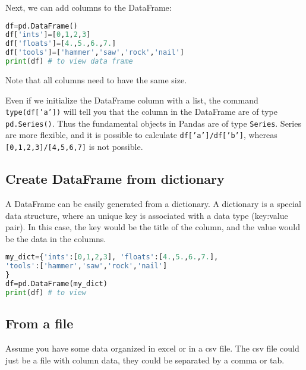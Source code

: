 \documentclass[graybox,sectrefs,envcountresetchap,open=right,final]{svmonodo}
\newenvironment{graybox2admon}[1][]{
\begin{graybox2mdframed}[frametitle=#1]
}
{
\end{graybox2mdframed}
}
\begin{document}
Next, we can add columns to the DataFrame:






\begin{lstlisting}[language=python,style=blue1bar]
df=pd.DataFrame()
df['ints']=[0,1,2,3]
df['floats']=[4.,5.,6.,7.]
df['tools']=['hammer','saw','rock','nail']
print(df) # to view data frame

\end{lstlisting}

Note that all columns need to have the same size.



\begin{graybox2admon}[\texttt{pd.Series()}]
Even if we initialize the DataFrame column with a list, the command \texttt{type(df['a'])} will tell you that the column in the DataFrame are of type \texttt{pd.Series()}. Thus the fundamental objects in Pandas are of type \texttt{Series}. Series are more flexible, and it is possible to calculate \texttt{df['a']/df['b']}, whereas \texttt{[0,1,2,3]/[4,5,6,7]} is not possible.
\end{graybox2admon}




\subsection{Create DataFrame from dictionary}
A DataFrame can be easily generated from a dictionary. A dictionary is a special data structure, where an unique key is associated with a data type (key:value pair). In this case, the key would be the title of the column, and the value would be the data in the columns.







\begin{lstlisting}[language=python,style=blue1bar]
my_dict={'ints':[0,1,2,3], 'floats':[4.,5.,6.,7.],
'tools':['hammer','saw','rock','nail']
}
df=pd.DataFrame(my_dict)
print(df) # to view

\end{lstlisting}


\subsection{From a file}
Assume you have some data organized in excel or in a csv file. The csv file could just be a file with column data, they could be separated by a comma or tab.
\end{document}
